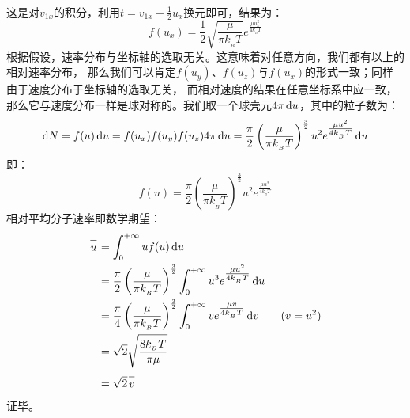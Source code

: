 \begin{prove}
\begin{equation*}
\begin{aligned}
				\end{aligned}
			\end{equation*}
			这是对$v_{1x}$的积分，利用$t = v_{1x} + \frac{1}{2}u_{x}$换元即可，结果为：
			\begin{equation*}
				f(u_x) = \frac{1}{2}\sqrt{\frac{\mu}{\pi k_{_B}T}}e^{\tfrac{\mu u_{x}^{2}}{4k_{_B}T}}
			\end{equation*}
			根据假设，速率分布与坐标轴的选取无关。这意味着对任意方向，我们都有以上的相对速率分布，
			那么我们可以肯定$f(u_y)$、$f(u_z)$与$f(u_x)$的形式一致；同样由于速度分布于坐标轴的选取无关，
			而相对速度的结果在任意坐标系中应一致，那么它与速度分布一样是球对称的。我们取一个球壳元$4\pi \dif u$，其中的粒子数为：
			\begin{equation*}
				\dif N = f(u)\dif u = f(u_x)f(u_y)f(u_z) 4\pi \dif u =  \frac{\pi}{2}\left(\frac{\mu}{\pi k_{_B}T}\right)^{\frac{3}{2}} u^{2} e^{\tfrac{\mu u^{2}}{4k_{_B}T}}\dif u
			\end{equation*}
			即：         
			\begin{equation*}
				f(u)= \frac{\pi}{2}\left(\frac{\mu}{\pi k_{_B}T}\right)^{\frac{3}{2}} u^{2} e^{\tfrac{\mu u^{2}}{4k_{_B}T}}
			\end{equation*}   
			相对平均分子速率即数学期望：
			\begin{equation*}
				\begin{aligned}
					\upperline{u}&= \int_{0}^{+\infty}uf(u)\dif u\\
					&=\frac{\pi}{2}\left(\frac{\mu}{\pi k_{_B}T}\right)^{\frac{3}{2}}\int_{0}^{+\infty} u^{3} e^{\tfrac{\mu u^{2}}{4k_{_B}T}}\dif u\\
					&=\frac{\pi}{4}\left(\frac{\mu}{\pi k_{_B}T}\right)^{\frac{3}{2}}\int_{0}^{+\infty} v e^{\tfrac{\mu v}{4k_{_B}T}}\dif v\qquad(v = u^2)\\
					&=\sqrt{2}\sqrt{\frac{8k_{_B}T}{\pi \mu}}\\
					&=\sqrt{2}\upperline{v}
				\end{aligned}
			\end{equation*}
			证毕。
		\end{prove}
